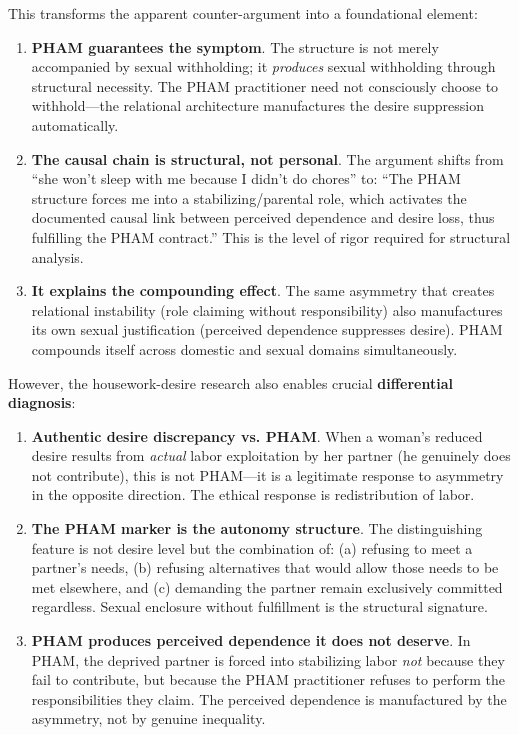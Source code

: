 \documentclass[12pt, letterpaper]{article}
\begin{document}
This transforms the apparent counter-argument into a foundational element:

\begin{enumerate}
    \item \textbf{PHAM guarantees the symptom}. The structure is not merely accompanied by sexual withholding; it \textit{produces} sexual withholding through structural necessity. The PHAM practitioner need not consciously choose to withhold---the relational architecture manufactures the desire suppression automatically.
    
    \item \textbf{The causal chain is structural, not personal}. The argument shifts from ``she won't sleep with me because I didn't do chores'' to: ``The PHAM structure forces me into a stabilizing/parental role, which activates the documented causal link between perceived dependence and desire loss, thus fulfilling the PHAM contract.'' This is the level of rigor required for structural analysis.
    
    \item \textbf{It explains the compounding effect}. The same asymmetry that creates relational instability (role claiming without responsibility) also manufactures its own sexual justification (perceived dependence suppresses desire). PHAM compounds itself across domestic and sexual domains simultaneously.
\end{enumerate}

However, the housework-desire research also enables crucial \textbf{differential diagnosis}:

\begin{enumerate}
    \item \textbf{Authentic desire discrepancy vs. PHAM}. When a woman's reduced desire results from \textit{actual} labor exploitation by her partner (he genuinely does not contribute), this is not PHAM---it is a legitimate response to asymmetry in the opposite direction. The ethical response is redistribution of labor.
    
    \item \textbf{The PHAM marker is the autonomy structure}. The distinguishing feature is not desire level but the combination of: (a) refusing to meet a partner's needs, (b) refusing alternatives that would allow those needs to be met elsewhere, and (c) demanding the partner remain exclusively committed regardless. Sexual enclosure without fulfillment is the structural signature.
    
    \item \textbf{PHAM produces perceived dependence it does not deserve}. In PHAM, the deprived partner is forced into stabilizing labor \textit{not} because they fail to contribute, but because the PHAM practitioner refuses to perform the responsibilities they claim. The perceived dependence is manufactured by the asymmetry, not by genuine inequality.
\end{enumerate}
\end{document}
